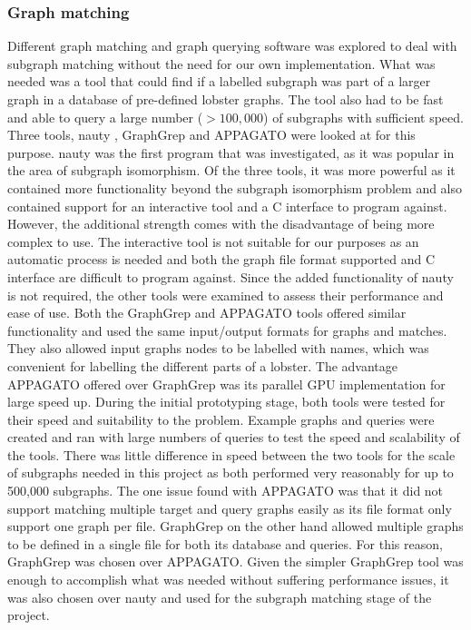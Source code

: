 \subsubsection{Graph matching}
Different graph matching and graph querying software was explored to deal with subgraph matching without the need for our own implementation. What was needed was a tool that could find if a labelled subgraph was part of a larger graph in a database of pre-defined lobster graphs. The tool also had to be fast and able to query a large number ($> 100,000$) of subgraphs with sufficient speed. Three tools, nauty \cite{nauty}, GraphGrep \cite{graphgrep} and APPAGATO \cite{appagato} were looked at for this purpose. 
\n
nauty was the first program that was investigated, as it was popular in the area of subgraph isomorphism. Of the three tools, it was more powerful as it contained more functionality beyond the subgraph isomorphism problem and also contained support for an interactive tool and a C interface to program against. However, the additional strength comes with the disadvantage of being more complex to use. The interactive tool is not suitable for our purposes as an automatic process is needed and both the graph file format supported and C interface are difficult to program against. Since the added functionality of nauty is not required, the other tools were examined to assess their performance and ease of use.
\n
Both the GraphGrep and APPAGATO tools offered similar functionality and used the same input/output formats for graphs and matches. They also allowed input graphs nodes to be labelled with names, which was convenient for labelling the different parts of a lobster. The advantage APPAGATO offered over GraphGrep was its parallel GPU implementation for large speed up. During the initial prototyping stage, both tools were tested for their speed and suitability to the problem. Example graphs and queries were created and ran with large numbers of queries to test the speed and scalability of the tools. There was little difference in speed between the two tools for the scale of subgraphs needed in this project as both performed very reasonably for up to 500,000 subgraphs. The one issue found with APPAGATO was that it did not support matching multiple target and query graphs easily as its file format only support one graph per file. GraphGrep on the other hand allowed multiple graphs to be defined in a single file for both its database and queries. For this reason, GraphGrep was chosen over APPAGATO. 
\n
Given the simpler GraphGrep tool was enough to accomplish what was needed without suffering performance issues, it was also chosen over nauty and used for the subgraph matching stage of the project.

